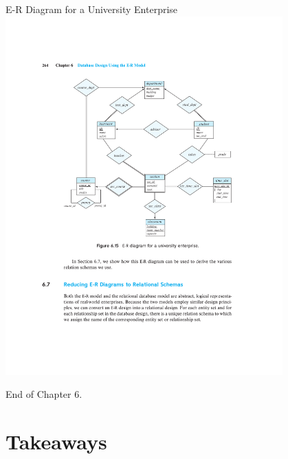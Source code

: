 \documentclass{beamer}
\begin{document}
\begin{frame}{E-R Diagram for a University Enterprise}
    \centering
    \includegraphics[trim={4.55cm 10.80cm 4.00cm 4.85cm}, clip, width=0.8\textwidth]{figures/p264}
\end{frame}











\begin{frame}{}
\end{frame}


\begin{frame}{}
     \centering
     \Huge End of Chapter 6.
\end{frame}

\section*{Takeaways}
\end{document}
